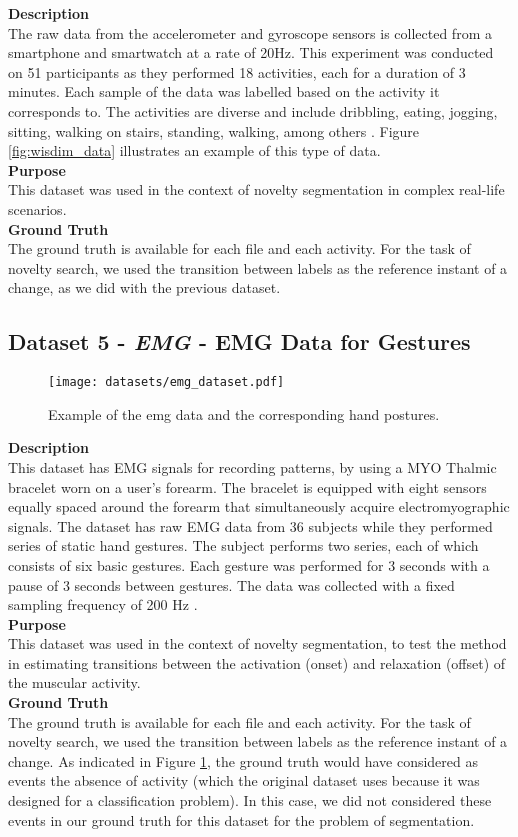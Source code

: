 \textbf{Description}\hfill\\
The raw data from the accelerometer and gyroscope sensors is collected from a smartphone and smartwatch at a rate of 20Hz. This experiment was conducted on 51 participants as they performed 18 activities, each for a duration of 3 minutes. Each sample of the data was labelled based on the activity it corresponds to. The activities are diverse and include dribbling, eating, jogging, sitting, walking on stairs, standing, walking, among others \cite{dataset4}. Figure \ref{fig:wisdim_data} illustrates an example of this type of data.\\
\textbf{Purpose}\hfill\\
This dataset was used in the context of novelty segmentation in complex real-life scenarios.\\
\textbf{Ground Truth}\\
The ground truth is available for each file and each activity. For the task of novelty search, we used the transition between labels as the reference instant of a change, as we did with the previous dataset.

\subsection{Dataset 5 - \textit{EMG} - EMG Data for Gestures}
\label{dat:dataset6}

\begin{figure}
\centering
\texttt{[image: datasets/emg\_dataset.pdf]}
\caption{Example of the \gls{emg} data and the corresponding hand postures.}
\label{fig:emg_dataset}
\end{figure}

\textbf{Description}\hfill\\
This dataset has EMG signals for recording patterns, by using a MYO Thalmic bracelet worn on a user's forearm. The bracelet is equipped with eight sensors equally spaced around the forearm that simultaneously acquire electromyographic signals. The dataset has raw EMG data from 36 subjects while they performed series of static hand gestures. The subject performs two series, each of which consists of six basic gestures. Each gesture was performed for 3 seconds with a pause of 3 seconds between gestures. The data was collected with a fixed sampling frequency of 200 Hz \cite{dataset5}.\\
\textbf{Purpose}\hfill\\
This dataset was used in the context of novelty segmentation, to test the method in estimating transitions between the activation (onset) and relaxation (offset) of the muscular activity.\\
\textbf{Ground Truth}\\
The ground truth is available for each file and each activity. For the task of novelty search, we used the transition between labels as the reference instant of a change. As indicated in Figure \ref{fig:emg_dataset}, the ground truth would have considered as events the absence of activity (which the original dataset uses because it was designed for a classification problem). In this case, we did not considered these events in our ground truth for this dataset for the problem of segmentation.    

